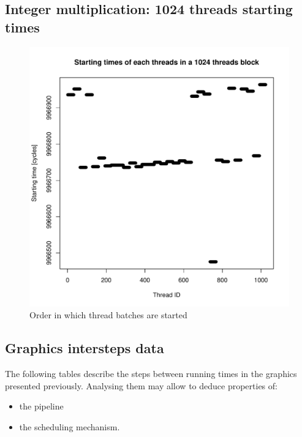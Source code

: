 \documentclass{article}
\def \scalingfactor{.8}
\begin{document}
	\subsection{Integer multiplication: 1024 threads starting times}
    \begin{figure}[h]
    		\centering
		\vspace{-20pt}
	    	\includegraphics[width=\scalingfactor\linewidth]{"graphics/starting_times_ratio31"}
	    	\vspace{-15pt}
	    	\caption{Order in which thread batches are started}
    \end{figure}

    \subsection{Graphics intersteps data}
    The following tables describe the steps between running times in the graphics presented previously. Analysing them may allow to deduce properties of: 
    \begin{itemize} 
        \item the pipeline
        \item the scheduling mechanism. 
    \end{itemize}
    \centering
    
    
    \pagebreak
\end{document}
